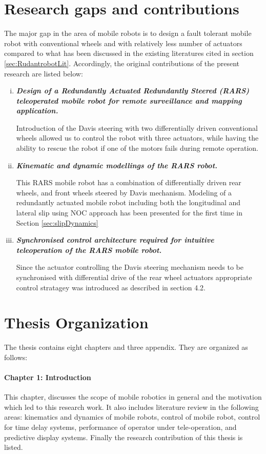 \section{Research gaps and  contributions}
The major gap in the area of mobile robots is to design a fault tolerant mobile robot with conventional wheels and with relatively less number of actuators compared to what has been discussed in the existing literatures cited in section \ref{sec:RudantrobotLit}. Accordingly, the original contributions of the present research are listed below:
\begin{enumerate}[(i)]

\item \textbf{\textit{Design of a Redundantly Actuated Redundantly Steered (RARS)  teleoperated mobile robot for remote surveillance and mapping application.}}

   Introduction of the Davis steering with two differentially  driven  conventional wheels allowed us to control the robot with three actuators, while having the ability to rescue the robot if one of the motors fails during remote operation.
		
 
	
\item \textbf{\textit{ Kinematic and dynamic modellings of the RARS robot.}}

		  This RARS mobile robot  has a combination of differentially driven rear wheels, and front wheels steered by  Davis mechanism.  Modeling of a redundantly actuated mobile robot  including both the longitudinal and lateral slip using NOC approach has  been presented for the first time in Section \ref{sec:slipDynamics}  
	   
\item \textbf{\textit{Synchronised control architecture required for intuitive teleoperation of the RARS mobile robot.}} 

Since the actuator controlling the Davis steering mechanism needs to be synchronised with differential drive of the rear wheel actuators appropriate control stratagey was introduced as described in section 4.2.




\end{enumerate}
\section{Thesis Organization}
The thesis contains eight chapters and three appendix. They are organized as follows:
\paragraph*{Chapter 1: Introduction\\}
This  chapter, discusses the scope of mobile robotics in general and the motivation which led to this research work. It also includes literature review in the following areas: kinematics and dynamics of mobile robots, control of mobile robot, control for time delay systems, performance of operator under tele-operation,  and predictive display systems. Finally the research contribution of this thesis is listed. 


